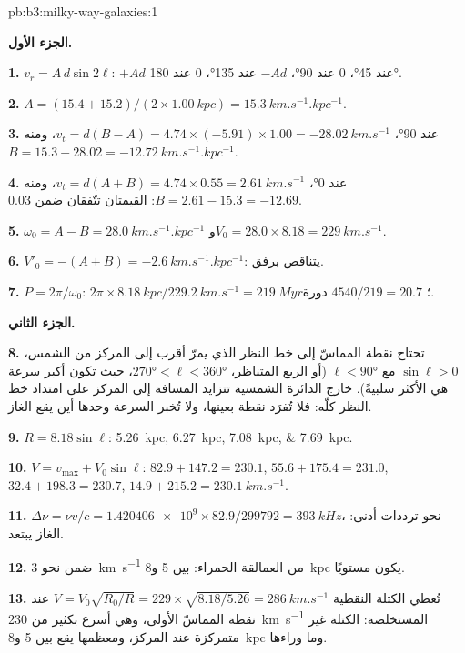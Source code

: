 \begin{solution}{pb:b3:milky-way-galaxies:1}

\textbf{الجزء الأول.}

\textbf{1.} $v_r = A\,d\sin2\ell$: $+A d$ عند \ang{45}، 0 عند \ang{90}، $-A d$
عند \ang{135}، 0 عند \ang{180}.

\textbf{2.} $A = (15.4 + 15.2)/(2\times\qty{1.00}{kpc}) =
\qty{15.3}{km.s^{-1}.kpc^{-1}}$.

\textbf{3.} عند \ang{90}، $v_t = d(B - A) = 4.74\times(-5.91)\times1.00 =
\qty{-28.02}{km.s^{-1}}$، ومنه $B = 15.3 - 28.02 =
\qty{-12.72}{km.s^{-1}.kpc^{-1}}$.

\textbf{4.} عند \ang{0}، $v_t = d(A + B) = 4.74\times0.55 =
\qty{2.61}{km.s^{-1}}$، ومنه $B = 2.61 - 15.3 = \num{-12.69}$: القيمتان
تتّفقان ضمن \num{0.03}.

\textbf{5.} $\omega_0 = A - B = \qty{28.0}{km.s^{-1}.kpc^{-1}}$
و$V_0 = 28.0\times8.18 = \qty{229}{km.s^{-1}}$.

\textbf{6.} $V'_0 = -(A + B) = \qty{-2.6}{km.s^{-1}.kpc^{-1}}$: يتناقص برفق.

\textbf{7.} $P = 2\pi/\omega_0$: $2\pi\times\qty{8.18}{kpc}/\qty{229.2}{km.s^{-1}}
= \qty{219}{Myr}$؛ $4540/219 = 20.7$ دورة.

\textbf{الجزء الثاني.}

\textbf{8.} تحتاج نقطة المماسّ إلى خط النظر الذي يمرّ أقرب إلى
المركز من الشمس، $\sin\ell > 0$ مع $\ell < \ang{90}$ (أو الربع
المتناظر، $\ang{270} < \ell < \ang{360}$، حيث تكون أكبر
سرعة هي الأكثر سلبيةً). خارج الدائرة الشمسية تتزايد المسافة
إلى المركز على امتداد خط النظر كلّه:
فلا تُفرَد نقطة بعينها، ولا تُخبر السرعة وحدها أين يقع الغاز.

\textbf{9.} $R = 8.18\sin\ell$: \qtylist{5.26;6.27;7.08;7.69}{kpc}.

\textbf{10.} $V = v_\mathrm{max} + V_0\sin\ell$: $82.9 + 147.2 = 230.1$,
$55.6 + 175.4 = 231.0$, $32.4 + 198.3 = 230.7$, $14.9 + 215.2 =
\qty{230.1}{km.s^{-1}}$.

\textbf{11.} $\Delta\nu = \nu v/c = \num{1.420406e9}\times82.9/299792 =
\qty{393}{kHz}$، نحو ترددات أدنى: الغاز يبتعد.

\textbf{12.} ضمن نحو \qty{3}{km.s^{-1}} من العمالقة الحمراء: بين 5
و\qty{8}{kpc} يكون  مستويًا.

\textbf{13.} تُعطي الكتلة النقطية $V = V_0\sqrt{R_0/R} = 229\times\sqrt{8.18/5.26} =
\qty{286}{km.s^{-1}}$ عند نقطة المماسّ الأولى، وهي أسرع بكثير من
\qty{230}{km.s^{-1}} المستخلصة: الكتلة غير متمركزة عند المركز،
ومعظمها يقع بين 5 و\qty{8}{kpc} وما وراءها.


\end{solution}
